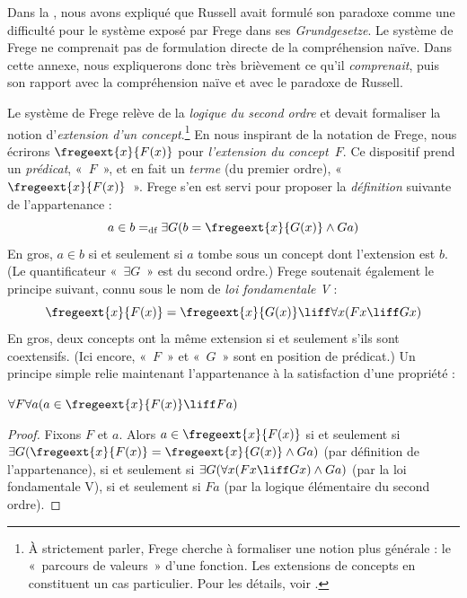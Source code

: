 \documentclass[../../../include/open-logic-section]{subfiles}
\begin{document}


Dans la , nous avons expliqué que Russell avait
formulé son paradoxe comme une difficulté pour le système exposé par
Frege dans ses \emph{Grundgesetze}. Le système de Frege ne comprenait
pas de formulation directe de la compréhension naïve. Dans cette
annexe, nous expliquerons donc très brièvement ce qu'il
\emph{comprenait}, puis son rapport avec la compréhension naïve et
avec le paradoxe de Russell.

Le système de Frege relève de la \emph{logique du second ordre} et
devait formaliser la notion d'\emph{extension d'un concept}.\footnote{À
strictement parler, Frege cherche à formaliser une notion plus
générale : le «~parcours de valeurs~» d'une fonction. Les extensions
de concepts en constituent un cas particulier. Pour les détails,
voir \citet[pp.\ 8--9]{Heck2012}.} En nous inspirant de la notation de
Frege, nous écrirons $\fregeext{x}{F(x)}$ pour \emph{l'extension du
concept~$F$}. Ce dispositif prend un \emph{prédicat}, «~$F$~», et
en fait un \emph{terme} (du premier ordre),
«~$\fregeext{x}{F(x)}$~». Frege s'en est servi pour proposer la
\emph{définition} suivante de l'appartenance :
\[
	a \in b =_\text{df} \exists G(b = \fregeext{x}{G(x)} \land Ga)
\]
En gros, $a \in b$ si et seulement si $a$ tombe sous un concept dont
l'extension est $b$. (Le quantificateur «~$\exists G$~» est du second
ordre.) Frege soutenait également le principe suivant, connu sous le
nom de \emph{loi fondamentale V} :
$$\fregeext{x}{F(x)} = \fregeext{x}{G(x)} \liff \forall x (Fx \liff Gx)$$
En gros, deux concepts ont la même extension si et seulement s'ils
sont coextensifs. (Ici encore, «~$F$~» et «~$G$~» sont en position de
prédicat.) Un principe simple relie maintenant l'appartenance à la
satisfaction d'une propriété :

\begin{lem}
$\forall F \forall a(a \in \fregeext{x}{F(x)} \liff Fa)$
\end{lem}

\begin{proof}
Fixons $F$ et $a$. Alors $a \in \fregeext{x}{F(x)}$ si et seulement
si $\exists G(\fregeext{x}{F(x)}
= \fregeext{x}{G(x)} \land Ga)$ (par définition de l'appartenance),
si et seulement si $\exists G(\forall x(Fx \liff Gx) \land Ga)$
(par la loi fondamentale V), si et seulement si $Fa$ (par la logique
élémentaire du second ordre).
\end{proof}
\end{document}
